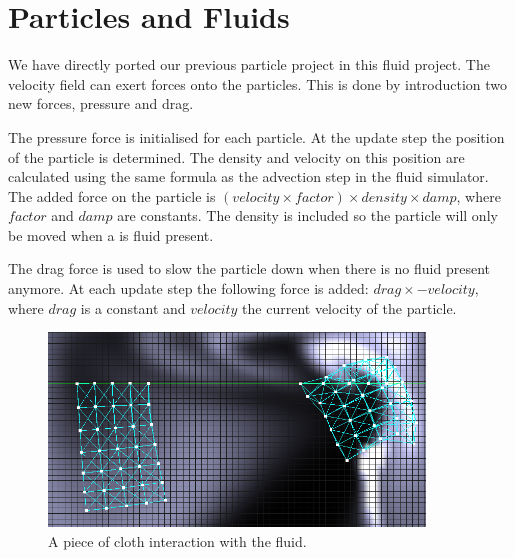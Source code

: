 \section{Particles and Fluids}
We have directly ported our previous particle project in this fluid project.
The velocity field can exert forces onto the particles.
This is done by introduction two new forces, pressure and drag.

\noindent The pressure force is initialised for each particle.
At the update step the position of the particle is determined.
The density and velocity on this position are calculated using the same formula as the advection step in the fluid simulator.
The added force on the particle is $(velocity \times factor) \times density \times damp$, where $factor$ and $damp$ are constants.
The density is included so the particle will only be moved when a is fluid present.

\noindent The drag force is used to slow the particle down when there is no fluid present anymore.
At each update step the following force is added: $drag \times -velocity$, where $drag$ is a constant and $velocity$ the current velocity of the particle.

\begin{figure}[h]
    \centering
    \includegraphics[width=10cm]{img/cloth.png}
    \caption{A piece of cloth interaction with the fluid.}
    \label{fig:cloth}
\end{figure}
